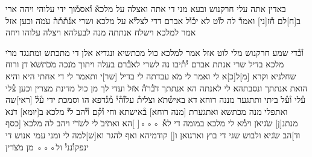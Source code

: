 \begin{translation}
\end{translation}

\begin{aramaictext}
    באדין אתה עלי חרקנוש ובעא מני די אתה ואצלה על
    מלכא֯ ו֯אסמ֯וך ידי עלוהי ויהה ארי ב[ח]לם ח֯ז[ני] ואמר֯ לה לו֯ט לא יכ֯ו֯ל
    אברם דדי לצלי֯א על
    מלכא ושרי אנ֯ת֯ת֯ה֯ ע̇מ̇ה וכען אזל אמר למלכא וישלח אנתתה מנה לבעלהא
    ויצלה עלוהו ויחה
\end{aramaictext}

\begin{translation}
\end{translation}

\begin{aramaictext}
    \vacat
    ו֯כ֯די שמע חרקנוש מלי לוט אזל אמר למלכא כול מכתשיא ונגדיא
    אלן די מתכתש ומתנגד מר̇י מלכא בדיל שרי אנתת אברם י֯ת֯יבו נה לשרי
    לא̇ב֯רם בעלה
    ויתוך מ̇נכה מ̇כ̇ת̇ש̇א̇ דן ורוח שחלניא וקרא [מ]ל[כ]א לי ואמר לי מ̇א עבדתה
    לי בדיל [שר]י ותאמר
    לי די אחתי היא והיא הואת אנתתך ונסבתהא לי לאנתה הא אנתתך ד̇ב֯ר̇ה֯
    א̇זל ועדי לך מן
    כול מדינת מצרין וכען צ֯לי ע֯לי ו֯ע֯ל ביתי ותתגער מננה רוחא דא באיש֯ת̇א
    וצ̇לית֯ עלו֯ה֯י֯ מ֯ג֯דפא
    הו וסמכת ידי ע֯ל֯ [ראי]שה ואתפלי מנה מכתשא ואתגערת [מנה רוחא]
    ב֯אישתא וחי ו֯ק֯ם ו֯י֯הב
    ל̇י֯ מלכא ב[יומא] ד̇נא̇ מנתנ[ן] ש̇גיא̇ן וימ֯א לי מלכא במומה די לא֯ ◦◦◦[  
    ]הא ואת̇יב̇ לי
    לש̇ר̇י ויהב לה מלכא̇ [כסף וד]הב ש̇גיא ולבוש שגי די בוץ וארגואן ו[\hspace{1em}]
    קודמיהא ואף להגר וא[ש]למה לי ומני עמי אנוש די ינפקו֯נני֯ ול◦◦◦ מן
    מ̇צ̇רין \vacat
\end{aramaictext}

\begin{translation}
\end{translation}